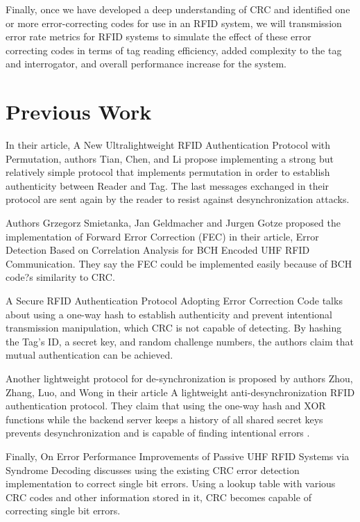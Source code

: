 \documentclass{sigcomm-alternate}
\begin{document}
Finally, once we have developed a deep understanding of CRC and identified one or more error-correcting codes for use in an RFID system, we will transmission error rate metrics for RFID systems to simulate the effect of these error correcting codes in terms of tag reading efficiency, added complexity to the tag and interrogator, and overall performance increase for the system.

\section{Previous Work}
In their article, A New Ultralightweight RFID Authentication Protocol with Permutation, authors Tian, Chen, and Li propose implementing a strong but relatively simple protocol that implements permutation in order to establish authenticity between Reader and Tag\cite{3}. The last messages exchanged in their protocol are sent again by the reader to resist against desynchronization attacks.

Authors Grzegorz Smietanka, Jan Geldmacher and Jurgen Gotze proposed the implementation of Forward Error Correction (FEC) in their article, Error Detection Based on Correlation Analysis for BCH Encoded UHF RFID Communication\cite{1}. They say the FEC could be implemented easily because of BCH code?s similarity to CRC. 

A Secure RFID Authentication Protocol Adopting Error Correction Code talks about using a one-way hash to establish authenticity and prevent intentional transmission manipulation, which CRC is not capable of detecting. By hashing the Tag's ID, a secret key, and random challenge numbers, the authors claim that mutual authentication can be achieved\cite{5}.

Another lightweight protocol for de-synchronization is proposed by authors Zhou, Zhang, Luo, and Wong in their article A lightweight anti-desynchronization RFID authentication protocol. They claim that using the one-way hash and XOR functions while the backend server keeps a history of all shared secret keys prevents desynchronization and is capable of finding intentional errors \cite{4}.

Finally, On Error Performance Improvements of Passive UHF RFID Systems via Syndrome Decoding discusses using the existing CRC error detection implementation to correct single bit errors. Using a lookup table with various CRC codes and other information stored in it, CRC becomes capable of correcting single bit errors\cite{2}.
\end{document}

